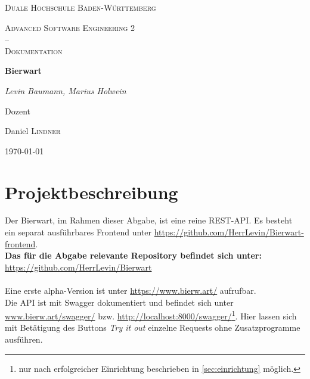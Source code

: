 \documentclass[12pt,a4paper,titlepage,ngerman,pdftex]{report}
\begin{document}
    \begin{titlepage}
        \centering
        {\scshape\LARGE Duale Hochschule Baden-Württemberg \par}
        \vspace{1cm}
        {\scshape\Large Advanced Software Engineering 2 \\--\\ Dokumentation\par}
        \vspace{1.5cm}
        {\huge\bfseries Bierwart\par}
        \vspace{2cm}
        {\Large\itshape Levin Baumann, Marius Holwein\par}
        \vfill
        Dozent\par
        Daniel \textsc{Lindner}

        \vfill

        {\large \today\par}
    \end{titlepage}

    \tableofcontents
    \listoffigures
    \lstlistoflistings

    \onehalfspacing

    \chapter{Projektbeschreibung}\label{ch:projektbeschreibung}
    Der Bierwart, im Rahmen dieser Abgabe, ist eine reine REST-API.
    Es besteht ein separat ausführbares Frontend unter \url{https://github.com/HerrLevin/Bierwart-frontend}. \\
    \textbf{Das für die Abgabe relevante Repository befindet sich unter:} \\ \url{https://github.com/HerrLevin/Bierwart}\\
    \\
    Eine erste alpha-Version ist unter \url{https://www.bierw.art/} aufrufbar.\\
    Die API ist mit Swagger dokumentiert und befindet sich unter \url{www.bierw.art/swagger/} bzw. \url{http://localhost:8000/swagger/}\footnote{nur nach erfolgreicher Einrichtung beschrieben in \ref{sec:einrichtung} möglich.}.
    Hier lassen sich mit Betätigung des Buttons \textit{Try it out} einzelne Requests ohne Zusatzprogramme ausführen.
\end{document}
